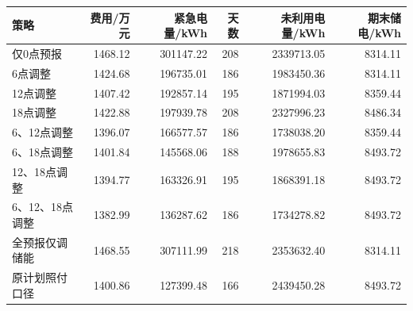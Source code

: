 \begin{tabular}{lrrrrr}
\toprule
策略 & 费用/万元 & 紧急电量/kWh & 天数 & 未利用电量/kWh & 期末储电/kWh \\
\midrule
仅0点预报 & 1468.12 & 301147.22 & 208 & 2339713.05 & 8314.11 \\
6点调整 & 1424.68 & 196735.01 & 186 & 1983450.36 & 8314.11 \\
12点调整 & 1407.42 & 192857.14 & 195 & 1871994.03 & 8359.44 \\
18点调整 & 1422.88 & 197939.78 & 208 & 2327996.23 & 8486.34 \\
6、12点调整 & 1396.07 & 166577.57 & 186 & 1738038.20 & 8359.44 \\
6、18点调整 & 1401.84 & 145568.06 & 188 & 1978655.83 & 8493.72 \\
12、18点调整 & 1394.77 & 163326.91 & 195 & 1868391.18 & 8493.72 \\
6、12、18点调整 & 1382.99 & 136287.62 & 186 & 1734278.82 & 8493.72 \\
全预报仅调储能 & 1468.55 & 307111.99 & 218 & 2353632.40 & 8314.11 \\
原计划照付口径 & 1400.86 & 127399.48 & 166 & 2439450.28 & 8493.72 \\
\bottomrule
\end{tabular}